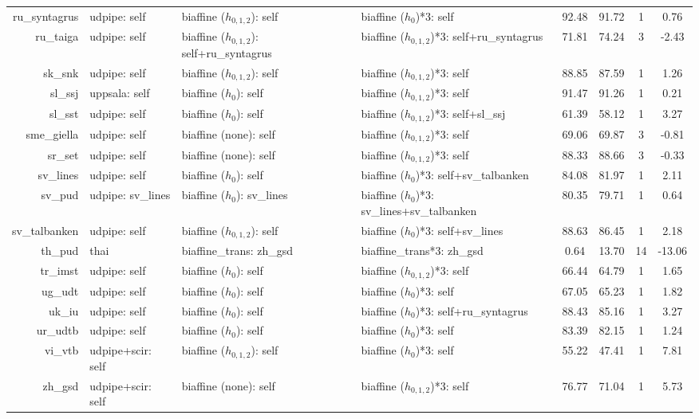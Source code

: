 \documentclass[11pt,a4paper]{article}
\begin{document}
\begin{table}[t]
\begin{tabular}{rlllcccc}
		ru\_syntagrus & udpipe: self & biaffine ($h_{0,1,2}$): self & biaffine ($h_{0}$)*3: self & 92.48 & 91.72 & 1 & 0.76 \\
		ru\_taiga & udpipe: self & biaffine ($h_{0,1,2}$): self+ru\_syntagrus & biaffine ($h_{0,1,2}$)*3: self+ru\_syntagrus & 71.81 & 74.24 & 3 & -2.43 \\
		sk\_snk & udpipe: self & biaffine ($h_{0,1,2}$): self & biaffine ($h_{0,1,2}$)*3: self & 88.85 & 87.59 & 1 & 1.26 \\
		sl\_ssj & uppsala: self & biaffine ($h_{0}$): self & biaffine ($h_{0,1,2}$)*3: self & 91.47 & 91.26 & 1 & 0.21 \\
		sl\_sst & udpipe: self & biaffine ($h_{0}$): self & biaffine ($h_{0,1,2}$)*3: self+sl\_ssj & 61.39 & 58.12 & 1 & 3.27 \\
		sme\_giella & udpipe: self & biaffine (none): self & biaffine ($h_{0,1,2}$)*3: self & 69.06 & 69.87 & 3 & -0.81 \\
		sr\_set & udpipe: self & biaffine (none): self & biaffine ($h_{0,1,2}$)*3: self & 88.33 & 88.66 & 3 & -0.33 \\
		sv\_lines & udpipe: self & biaffine ($h_{0}$): self & biaffine ($h_{0}$)*3: self+sv\_talbanken & 84.08 & 81.97 & 1 & 2.11 \\
		sv\_pud & udpipe: sv\_lines & biaffine ($h_{0}$): sv\_lines & biaffine ($h_{0}$)*3: sv\_lines+sv\_talbanken & 80.35 & 79.71 & 1 & 0.64 \\
		sv\_talbanken & udpipe: self & biaffine ($h_{0,1,2}$): self & biaffine ($h_{0}$)*3: self+sv\_lines & 88.63 & 86.45 & 1 & 2.18 \\
		th\_pud & thai & biaffine\_trans: zh\_gsd & biaffine\_trans*3: zh\_gsd & 0.64 & 13.70 & 14 & -13.06 \\
		tr\_imst & udpipe: self & biaffine ($h_{0}$): self & biaffine ($h_{0,1,2}$)*3: self & 66.44 & 64.79 & 1 & 1.65 \\
		ug\_udt & udpipe: self & biaffine ($h_{0}$): self & biaffine ($h_{0}$)*3: self & 67.05 & 65.23 & 1 & 1.82 \\
		uk\_iu & udpipe: self & biaffine ($h_{0}$): self & biaffine ($h_{0}$)*3: self+ru\_syntagrus & 88.43 & 85.16 & 1 & 3.27 \\
		ur\_udtb & udpipe: self & biaffine ($h_{0}$): self & biaffine ($h_{0}$)*3: self & 83.39 & 82.15 & 1 & 1.24 \\
		vi\_vtb & udpipe+scir: self & biaffine ($h_{0,1,2}$): self & biaffine ($h_{0}$)*3: self & 55.22 & 47.41 & 1 & 7.81 \\
		zh\_gsd & udpipe+scir: self & biaffine (none): self & biaffine ($h_{0,1,2}$)*3: self & 76.77 & 71.04 & 1 & 5.73 \\

\end{tabular}
\end{table}
\end{document}
